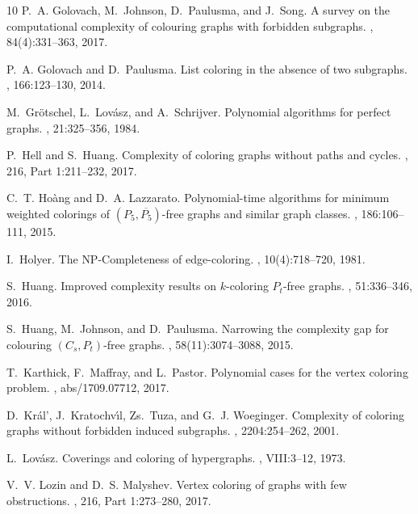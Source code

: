 \documentclass{llncs}
\begin{document}
\begin{thebibliography}{10}
P.~A. Golovach, M.~Johnson, D.~Paulusma, and J.~Song.
\newblock A survey on the computational complexity of colouring graphs with
  forbidden subgraphs.
, 84(4):331--363, 2017.

P.~A. Golovach and D.~Paulusma.
\newblock List coloring in the absence of two subgraphs.
, 166:123--130, 2014.

M.~Gr\"otschel, L.~Lov\'asz, and A.~Schrijver.
\newblock Polynomial algorithms for perfect graphs.
, 21:325--356, 1984.

P.~Hell and S.~Huang.
\newblock Complexity of coloring graphs without paths and cycles.
, 216, Part 1:211--232, 2017.

C.~T. Ho\`ang and D.~A. Lazzarato.
\newblock Polynomial-time algorithms for minimum weighted colorings of
  {$(P_5,\overline{P_5})$}-free graphs and similar graph classes.
, 186:106--111, 2015.

I.~Holyer.
\newblock The {NP-Completeness} of edge-coloring.
, 10(4):718--720, 1981.

S.~Huang.
\newblock Improved complexity results on $k$-coloring {$P_t$-free} graphs.
, 51:336--346, 2016.

S.~Huang, M.~Johnson, and D.~Paulusma.
\newblock Narrowing the complexity gap for colouring {$(C_s,P_t)$-free} graphs.
, 58(11):3074--3088, 2015.

T.~Karthick, F.~Maffray, and L.~Pastor.
\newblock Polynomial cases for the vertex coloring problem.
, abs/1709.07712, 2017.

D.~Kr{\'a}l', J.~Kratochv\'{\i}l, {\relax Zs}.~Tuza, and G.~J. Woeginger.
\newblock Complexity of coloring graphs without forbidden induced subgraphs.
, 2204:254--262, 2001.

L.~Lov\'asz.
\newblock Coverings and coloring of hypergraphs.
, VIII:3--12, 1973.

V.~V. Lozin and D.~S. Malyshev.
\newblock Vertex coloring of graphs with few obstructions.
, 216, Part 1:273--280, 2017.


\end{thebibliography}
\end{document}
